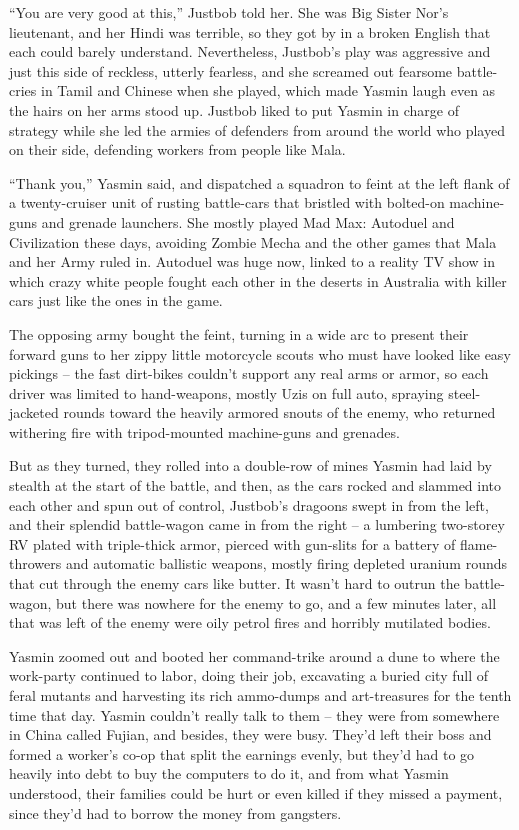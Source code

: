 ``You are very good at this,'' Justbob told her. She was Big Sister
Nor's lieutenant, and her Hindi was terrible, so they got by in a
broken English that each could barely understand. Nevertheless,
Justbob's play was aggressive and just this side of reckless,
utterly fearless, and she screamed out fearsome battle-cries in
Tamil and Chinese when she played, which made Yasmin laugh even as
the hairs on her arms stood up. Justbob liked to put Yasmin in
charge of strategy while she led the armies of defenders from
around the world who played on their side, defending workers from
people like Mala.

``Thank you,'' Yasmin said, and dispatched a squadron to feint at the
left flank of a twenty-cruiser unit of rusting battle-cars that
bristled with bolted-on machine-guns and grenade launchers. She
mostly played Mad Max: Autoduel and Civilization these days,
avoiding Zombie Mecha and the other games that Mala and her Army
ruled in. Autoduel was huge now, linked to a reality TV show in
which crazy white people fought each other in the deserts in
Australia with killer cars just like the ones in the game.

The opposing army bought the feint, turning in a wide arc to
present their forward guns to her zippy little motorcycle scouts
who must have looked like easy pickings -- the fast dirt-bikes
couldn't support any real arms or armor, so each driver was limited
to hand-weapons, mostly Uzis on full auto, spraying steel-jacketed
rounds toward the heavily armored snouts of the enemy, who returned
withering fire with tripod-mounted machine-guns and grenades.

But as they turned, they rolled into a double-row of mines Yasmin
had laid by stealth at the start of the battle, and then, as the
cars rocked and slammed into each other and spun out of control,
Justbob's dragoons swept in from the left, and their splendid
battle-wagon came in from the right -- a lumbering two-storey RV
plated with triple-thick armor, pierced with gun-slits for a
battery of flame-throwers and automatic ballistic weapons, mostly
firing depleted uranium rounds that cut through the enemy cars like
butter. It wasn't hard to outrun the battle-wagon, but there was
nowhere for the enemy to go, and a few minutes later, all that was
left of the enemy were oily petrol fires and horribly mutilated
bodies.

Yasmin zoomed out and booted her command-trike around a dune to
where the work-party continued to labor, doing their job,
excavating a buried city full of feral mutants and harvesting its
rich ammo-dumps and art-treasures for the tenth time that day.
Yasmin couldn't really talk to them -- they were from somewhere in
China called Fujian, and besides, they were busy. They'd left their
boss and formed a worker's co-op that split the earnings evenly,
but they'd had to go heavily into debt to buy the computers to do
it, and from what Yasmin understood, their families could be hurt
or even killed if they missed a payment, since they'd had to borrow
the money from gangsters.

